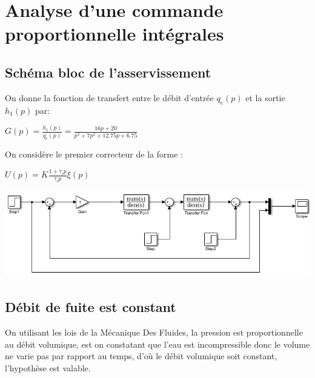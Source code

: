 \documentclass[12pt, a4paper, openany]{report}
\begin{document}
\chapter{ Analyse d'une commande proportionnelle intégrales}
 
 \section{Schéma bloc de l'asservissement}  %
   On donne la fonction de transfert entre le débit d'entrée  $q_{e}(p)$ et la sortie  $h_{1}(p)$ par: \\
   \begin{center}
   $G(p)=\frac {h_{1}(p)}{q_{e}(p)}=\frac{16p+20}{p^{3}+7p^{2}+12.75p+6.75}$   
   \end{center}
   
   On considère le premier correcteur de la forme : \\
   \begin{center}
   $U(p)=K\frac {1+\tau_{i}p}{\tau_{i}p}\xi(p)$ 
   \\[2cm]  
   \end{center}  
   
   \begin{center}
    \includegraphics[scale=0.8]{schemabloc.png}
    \label{fig2}
   \end{center}
  
   
  
 \section{Débit de fuite est constant}  %
 
 
 On utilisant les lois de la Mécanique Des Fluides, la pression est proportionnelle au débit volumique, est on constatant que l'eau est incompressible donc le volume ne varie pas par rapport au temps, d’où le débit volumique soit constant, l'hypothèse est valable. 
 
\end{document}
